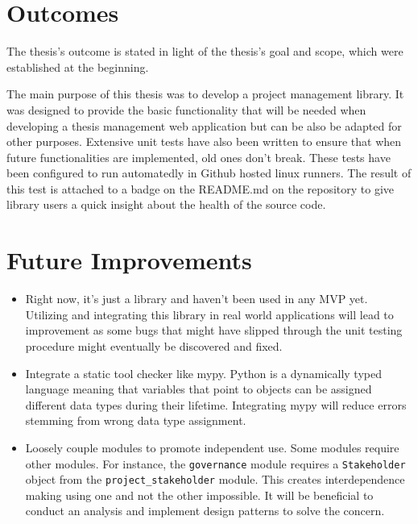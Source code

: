 \section{Outcomes}The thesis's outcome is stated in light of the thesis's goal and scope, which were established at the beginning.

The main purpose of this thesis was to develop a project management library. It was designed to provide the basic functionality that will be needed when developing a thesis management web application but can be also be adapted for other purposes. Extensive unit tests have also been written to ensure that when future functionalities are implemented, old ones don't break. These tests have been configured to run automatedly in Github hosted linux runners. The result of this test is attached to a badge on the README.md on the repository to give library users a quick insight about the health of the source code.


\section{Future Improvements}
\begin{itemize}
  \item Right now, it's just a library and haven't been used in any MVP yet. Utilizing and integrating this library in real world applications will lead to improvement as some bugs that might have slipped through the unit testing procedure might eventually be discovered and fixed.
  \item Integrate a static tool checker like mypy. Python is a dynamically typed language meaning that variables that point to objects can be assigned different data types during their lifetime. Integrating mypy will reduce errors stemming from wrong data type assignment.
  \item Loosely couple modules to promote independent use. Some modules require other modules. For instance, the \verb+governance+ module requires a \verb+Stakeholder+ object from the \verb+project_stakeholder+ module. This creates interdependence making using one and not the other impossible. It will be beneficial to conduct an analysis and implement design patterns to solve the concern.
\end{itemize}
